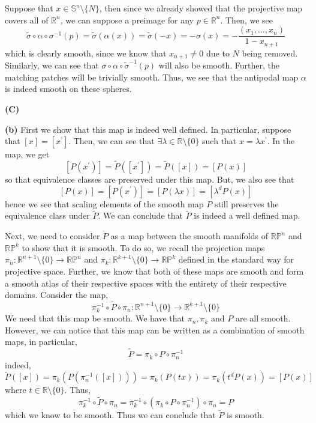 \documentclass[10pt]{article}
\newcommand{\R}{\mathbb{R}}
\newcommand{\Sp}{\mathbb{S}}
\newcommand{\Pro}{\mathbb{P}}
\begin{document}
Suppose that $x\in \Sp^{n}\setminus \{N\}$, then since we already showed that the projective map covers all of $\R^{n}$, we can suppose a preimage for any $p\in \R^{n}$. Then, we see
$$\tilde{\sigma} \circ \alpha \circ \sigma^{-1} (p) = \tilde{\sigma}(\alpha(x)) = \tilde{\sigma}(-x) = -\sigma(x) = -\frac{(x_{1},\dots,x_{n})}{1-x_{n+1}}$$
which is clearly smooth, since we know that $x_{n+1} \neq 0$ due to $N$ being removed. Similarly, we can see that $\sigma \circ \alpha \circ \tilde{\sigma}^{-1} (p)$ will also be smooth. Further, the matching patches will be trivially smooth. Thus, we see that the antipodal map $\alpha$ is indeed smooth on these spheres.

\textbf{(C)}

\textbf{(b)} First we show that this map is indeed well defined. In particular, suppose that $[x] = [x^{\prime}]$. Then, we can see that $\exists \lambda \in \R\setminus \{0\}$ such that $x = \lambda x^{\prime}$. In the map, we get
$$[P(x^{\prime})] = \tilde{P}([x^{\prime}]) = \tilde{P}([x]) = [P(x)]$$
so that equivalence classes are preserved under this map. But, we also see that
$$[P(x)] = [P(x^{\prime})] = [P(\lambda x)] = [\lambda^{d}P(x)]$$
hence we see that scaling elements of the smooth map $P$ still preserves the equivalence class under $\tilde{P}$. We can conclude that $\tilde{P}$ is indeed a well defined map.

Next, we need to consider $\tilde{P}$ as a map between the smooth manifolds of $\R\Pro^{n}$ and $\R\Pro^{k}$ to show that it is smooth. To do so, we recall the projection maps $\pi_{n}: \R^{n+1}\setminus\{0\} \to \R\Pro^{n}$ and $\pi_{k}: \R^{k+1}\setminus\{0\} \to \R\Pro^{k}$ defined in the standard way for projective space. Further, we know that both of these maps are smooth and form a smooth atlas of their respective spaces with the entirety of their respective domains. Consider the map,
$$\pi_{k}^{-1} \circ \tilde{P} \circ \pi_{n}: \R^{n+1}\setminus\{0\} \to \R^{k+1}\setminus \{0\}$$
We need that this map be smooth. We have that $\pi_{n},\pi_{k}$ and $P$ are all smooth. However, we can notice that this map can be written as a combination of smooth maps, in particular,
$$\tilde{P} = \pi_{k} \circ P \circ \pi_{n}^{-1}$$
indeed,
$$\tilde{P}([x]) = \pi_{k}\left(P\left(\pi_{n}^{-1}\left([x]\right)\right)\right) = \pi_{k}\left(P(tx)\right) = \pi_{k}\left(t^{d}P(x)\right) = [P(x)]$$
where $t\in \R\setminus \{0\}$. Thus,
$$\pi_{k}^{-1} \circ \tilde{P} \circ \pi_{n} = \pi_{k}^{-1} \circ \left(\pi_{k} \circ P \circ \pi_{n}^{-1}\right) \circ \pi_{n} = P$$
which we know to be smooth. Thus we can conclude that $\tilde{P}$ is smooth.
\end{document}
